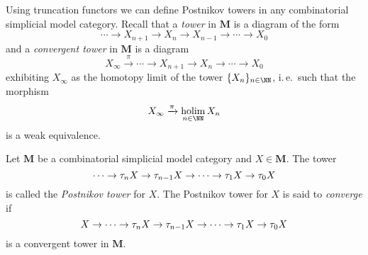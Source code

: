 Using truncation functors we can define Postnikov towers in any combinatorial simplicial model category. Recall that a \emph{tower} in \(\mathbf M\) is a diagram of the form
\[\cdots \to X_{n+1}\to X_{n}\to X_{n-1}\to \cdots \to X_{0} \]
and a \emph{convergent tower} in \(\mathbf M\) is a diagram
\[X_{\infty}\xrightarrow{\pi} \cdots \to X_{n+1}\to X_{n}\to\cdots\to X_{0}\]
exhibiting \(X_{\infty}\) as the homotopy limit of the tower \(\{X_{n}\}_{n\in\NN}\), i.\,e.~such that the morphism
\[X_{\infty}\xrightarrow{\pi}\holim_{n\in\NN} X_{n}\]
is a weak equivalence.

\begin{definition}
  Let \(\mathbf M\) be a combinatorial simplicial model category and \(X\in\mathbf M\). The tower
  \[\cdots\to\tau_{n} X\to\tau_{n-1} X\to\cdots\to\tau_{1} X\to\tau_{0}X\]
  is called the \emph{Postnikov tower} for \(X\). The Postnikov tower for \(X\) is said to \emph{converge} if
  \[X\to\cdots\to\tau_{n} X\to\tau_{n-1} X\to\cdots\to\tau_{1} X\to\tau_{0}X\]
  is a convergent tower in \(\mathbf M\).
\end{definition}

\printbibliography

\listoftodos
